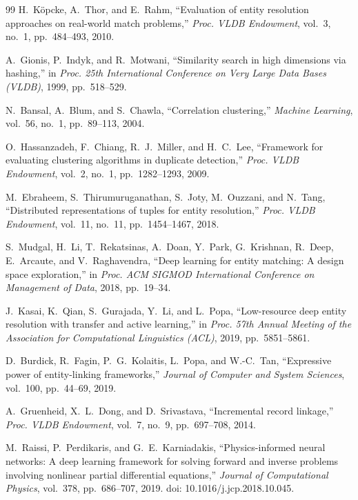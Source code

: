 \documentclass[12pt,a4paper]{report}
\begin{document}
\begin{thebibliography}{99}
 H.~Köpcke, A.~Thor, and E.~Rahm, ``Evaluation of entity resolution approaches on real-world match problems,'' \emph{Proc. VLDB Endowment}, vol.~3, no.~1, pp.~484--493, 2010.

 A.~Gionis, P.~Indyk, and R.~Motwani, ``Similarity search in high dimensions via hashing,'' in \emph{Proc. 25th International Conference on Very Large Data Bases (VLDB)}, 1999, pp.~518--529.

 N.~Bansal, A.~Blum, and S.~Chawla, ``Correlation clustering,'' \emph{Machine Learning}, vol.~56, no.~1, pp.~89--113, 2004.

 O.~Hassanzadeh, F.~Chiang, R.~J.~Miller, and H.~C.~Lee, ``Framework for evaluating clustering algorithms in duplicate detection,'' \emph{Proc. VLDB Endowment}, vol.~2, no.~1, pp.~1282--1293, 2009.

 M.~Ebraheem, S.~Thirumuruganathan, S.~Joty, M.~Ouzzani, and N.~Tang, ``Distributed representations of tuples for entity resolution,'' \emph{Proc. VLDB Endowment}, vol.~11, no.~11, pp.~1454--1467, 2018.

 S.~Mudgal, H.~Li, T.~Rekatsinas, A.~Doan, Y.~Park, G.~Krishnan, R.~Deep, E.~Arcaute, and V.~Raghavendra, ``Deep learning for entity matching: A design space exploration,'' in \emph{Proc. ACM SIGMOD International Conference on Management of Data}, 2018, pp.~19--34.

 J.~Kasai, K.~Qian, S.~Gurajada, Y.~Li, and L.~Popa, ``Low-resource deep entity resolution with transfer and active learning,'' in \emph{Proc. 57th Annual Meeting of the Association for Computational Linguistics (ACL)}, 2019, pp.~5851--5861.

 D.~Burdick, R.~Fagin, P.~G.~Kolaitis, L.~Popa, and W.-C.~Tan, ``Expressive power of entity-linking frameworks,'' \emph{Journal of Computer and System Sciences}, vol.~100, pp.~44--69, 2019.

 A.~Gruenheid, X.~L.~Dong, and D.~Srivastava, ``Incremental record linkage,'' \emph{Proc. VLDB Endowment}, vol.~7, no.~9, pp.~697--708, 2014.

 M.~Raissi, P.~Perdikaris, and G.~E.~Karniadakis, ``Physics-informed neural networks: A deep learning framework for solving forward and inverse problems involving nonlinear partial differential equations,'' \emph{Journal of Computational Physics}, vol.~378, pp.~686--707, 2019. doi: 10.1016/j.jcp.2018.10.045.


\end{thebibliography}
\end{document}
